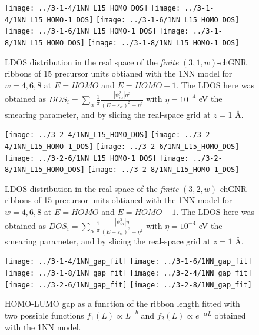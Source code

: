 \documentclass[amsmath,%
amssymb,prb,superscriptaddress]{revtex4}
\begin{document}
\begin{figure*}
	\texttt{[image: ../3-1-4/1NN\_L15\_HOMO\_DOS]}
	\texttt{[image: ../3-1-4/1NN\_L15\_HOMO-1\_DOS]}
	\texttt{[image: ../3-1-6/1NN\_L15\_HOMO\_DOS]}
	\texttt{[image: ../3-1-6/1NN\_L15\_HOMO-1\_DOS]}
	\texttt{[image: ../3-1-8/1NN\_L15\_HOMO\_DOS]}
	\texttt{[image: ../3-1-8/1NN\_L15\_HOMO-1\_DOS]}
	\caption{LDOS distribution in the real space of the \emph{finite} $(3,1,w)$-chGNR ribbons of 15 precursor units obtianed with the 1NN model for $w=4,6,8$ at $E=HOMO$ and $E=HOMO-1$. The LDOS here was obtained as $DOS_{i}=\sum_{\alpha}\frac{1}{\pi}\frac{|\psi_{i\alpha}^{2}|\eta^{2}}{(E-\varepsilon_{\alpha})^{2}+\eta^{2}}$ with $\eta=10^{-4}$ eV the smearing parameter, and by slicing the real-space grid at $z=1$ \AA.}
\end{figure*}

\begin{figure*}
	\texttt{[image: ../3-2-4/1NN\_L15\_HOMO\_DOS]}
	\texttt{[image: ../3-2-4/1NN\_L15\_HOMO-1\_DOS]}
	\texttt{[image: ../3-2-6/1NN\_L15\_HOMO\_DOS]}
	\texttt{[image: ../3-2-6/1NN\_L15\_HOMO-1\_DOS]}
	\texttt{[image: ../3-2-8/1NN\_L15\_HOMO\_DOS]}
	\texttt{[image: ../3-2-8/1NN\_L15\_HOMO-1\_DOS]}
	\caption{LDOS distribution in the real space of the \emph{finite} $(3,2,w)$-chGNR ribbons of 15 precursor units obtianed with the 1NN model for $w=4,6,8$ at $E=HOMO$ and $E=HOMO-1$. The LDOS here was obtained as $DOS_{i}=\sum_{\alpha}\frac{1}{\pi}\frac{|\psi_{i\alpha}^{2}|\eta}{(E-\varepsilon_{\alpha})^{2}+\eta^{2}}$ with $\eta=10^{-4}$ eV the smearing parameter, and by slicing the real-space grid at $z=1$ \AA.}
\end{figure*}

\begin{figure*}
	\texttt{[image: ../3-1-4/1NN\_gap\_fit]}
	\texttt{[image: ../3-1-6/1NN\_gap\_fit]}
	\texttt{[image: ../3-1-8/1NN\_gap\_fit]}
	\texttt{[image: ../3-2-4/1NN\_gap\_fit]}
	\texttt{[image: ../3-2-6/1NN\_gap\_fit]}
	\texttt{[image: ../3-2-8/1NN\_gap\_fit]}	
	\caption{HOMO-LUMO gap as a function of the ribbon length fitted with two possible functions $f_{1}(L) \propto L^{-b}$ and $f_{2}(L) \propto e^{-\alpha L}$ obtained with the 1NN model.}	
	\label{fig:gap-fit-length}		
\end{figure*}
\end{document}
